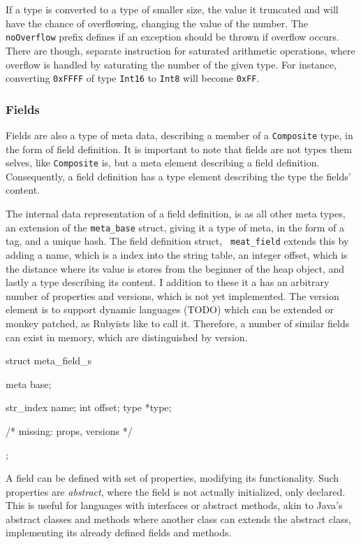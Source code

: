 If a type is converted to a type of smaller size, the value it truncated and
will have the chance of overflowing, changing the value of the number. The {\tt
  noOverflow} prefix defines if an exception should be thrown if overflow
occurs. There are though, separate instruction for saturated arithmetic
operations, where overflow is handled by saturating the number of the given
type. For instance, converting {\tt 0xFFFF} of type {\tt Int16} to {\tt Int8}
will become {\tt 0xFF}.


\subsubsection{Fields}

Fields are also a type of meta data, describing a member of a {\tt Composite}
type, in the form of field definition. It is important to note that fields are
not types them selves, like {\tt Composite} is, but a meta element describing a
field definition. Consequently, a field definition has a type element describing
the type the fields' content.

The internal data representation of a field definition, is as all other meta
types, an extension of the {\tt meta\_base} struct, giving it a type of meta, in
the form of a tag, and a unique hash. The field definition struct, {\tt
  meat\_field} extends this by adding a name, which is a index into the string
table, an integer offset, which is the distance where its value is stores from
the beginner of the heap object, and lastly a type describing its content. I
addition to these it a has an arbitrary number of properties and versions, which
is not yet implemented. The version element is to support dynamic languages
(TODO) which can be extended or monkey patched, as Rubyists like to call
it. Therefore, a number of similar fields can exist in memory, which are
distinguished by version. %
\begin{ccode} %
struct meta_field_s {
    meta base;

    str_index name;
    int offset;
    type *type;

    /* missing: props, versions */
};
\end{ccode}

A field can be defined with set of properties, modifying its
functionality. Such properties are {\em abstract}, where the field is not
actually initialized, only declared. This is useful for languages with
interfaces or abstract methods, akin to Java's abstract classes and methods
where another class can extends the abstract class, implementing its already
defined fields and methods.

